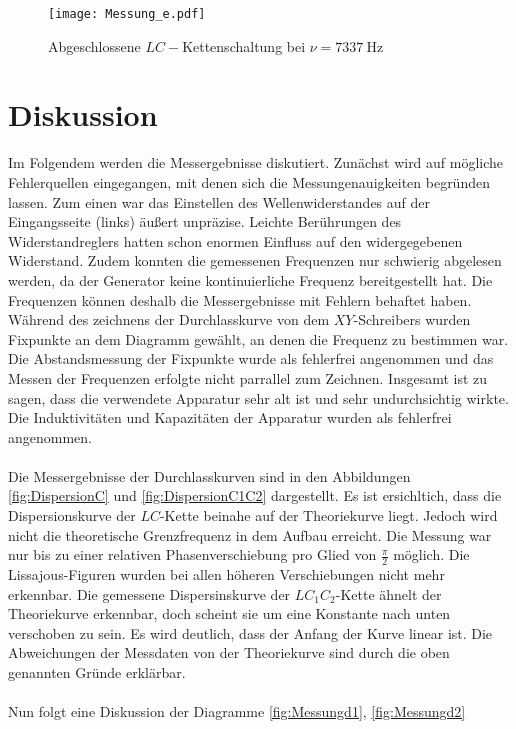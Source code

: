 \begin{figure}
  \texttt{[image: Messung\_e.pdf]}
  \caption{Abgeschlossene $LC-$Kettenschaltung bei $\nu = \SI{7337}{\hertz}$}
  \label{fig:Messunge}
\end{figure}

\section{Diskussion}

Im Folgendem werden die Messergebnisse diskutiert.
Zunächst wird auf mögliche Fehlerquellen eingegangen, mit denen sich die Messungenauigkeiten
begründen lassen. Zum einen war das Einstellen des Wellenwiderstandes auf der
Eingangsseite (links) äußert unpräzise. Leichte Berührungen des Widerstandreglers
hatten schon enormen Einfluss auf den widergegebenen Widerstand.
Zudem konnten die gemessenen Frequenzen nur schwierig abgelesen werden, da der
Generator keine kontinuierliche Frequenz bereitgestellt hat. Die Frequenzen
können deshalb die Messergebnisse mit Fehlern behaftet haben.
Während des zeichnens der Durchlasskurve von dem $XY$-Schreibers wurden Fixpunkte
an dem Diagramm gewählt, an denen die Frequenz zu bestimmen war. Die Abstandsmessung
der Fixpunkte wurde als fehlerfrei angenommen und das Messen der Frequenzen
erfolgte nicht parrallel zum Zeichnen.
Insgesamt ist zu sagen, dass die verwendete Apparatur sehr alt ist und sehr
undurchsichtig wirkte.
Die Induktivitäten und Kapazitäten der Apparatur wurden als fehlerfrei angenommen.\\ \\
Die Messergebnisse der Durchlasskurven sind in den Abbildungen \ref{fig:DispersionC}
und \ref{fig:DispersionC1C2} dargestellt. Es ist ersichltich, dass
die Dispersionskurve der $LC$-Kette beinahe auf der Theoriekurve liegt.
Jedoch wird nicht die theoretische Grenzfrequenz in dem Aufbau erreicht.
Die Messung war nur bis zu einer relativen Phasenverschiebung pro Glied von
$\frac{\pi}{2}$ möglich. Die Lissajous-Figuren wurden bei allen höheren
Verschiebungen nicht mehr erkennbar. Die gemessene Dispersinskurve der
$LC_1C_2$-Kette ähnelt der Theoriekurve erkennbar, doch scheint sie um eine
Konstante nach unten verschoben zu sein. Es wird deutlich, dass der Anfang
der Kurve linear ist. Die Abweichungen der Messdaten von der Theoriekurve
sind durch die oben genannten Gründe erklärbar.\\ \\
Nun folgt eine Diskussion der Diagramme \ref{fig:Messungd1}, \ref{fig:Messungd2}
